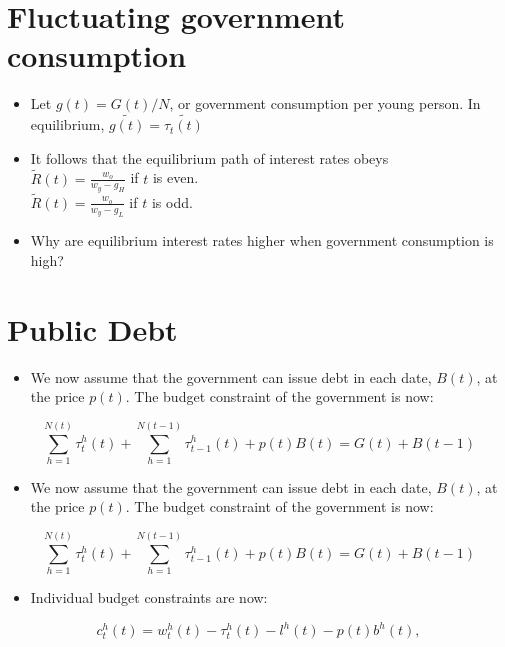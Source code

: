 \documentclass[10pt]{article}
\begin{document}
\section*{Fluctuating government consumption}
\begin{itemize}
  \item Let $g(t)=G(t) / N$, or government consumption per young person. In equilibrium, $\widetilde{g(t)}=\widetilde{\tau_{t}(t)}$
  \item It follows that the equilibrium path of interest rates obeys\\
$\widetilde{R}(t)=\frac{w_{o}}{w_{y}-g_{H}}$ if $t$ is even.\\
$\widetilde{R}(t)=\frac{w_{o}}{w_{y}-g_{L}}$ if $t$ is odd.
  \item Why are equilibrium interest rates higher when government consumption is high?
\end{itemize}

\section*{Public Debt}
\begin{itemize}
  \item We now assume that the government can issue debt in each date, $B(t)$, at the price $p(t)$. The budget constraint of the government is now:
\end{itemize}

$$
\sum_{h=1}^{N(t)} \tau_{t}^{h}(t)+\sum_{h=1}^{N(t-1)} \tau_{t-1}^{h}(t)+p(t) B(t)=G(t)+B(t-1)
$$

\begin{itemize}
  \item We now assume that the government can issue debt in each date, $B(t)$, at the price $p(t)$. The budget constraint of the government is now:
\end{itemize}

$$
\sum_{h=1}^{N(t)} \tau_{t}^{h}(t)+\sum_{h=1}^{N(t-1)} \tau_{t-1}^{h}(t)+p(t) B(t)=G(t)+B(t-1)
$$

\begin{itemize}
  \item Individual budget constraints are now:
\end{itemize}


\begin{equation*}
c_{t}^{h}(t)=w_{t}^{h}(t)-\tau_{t}^{h}(t)-l^{h}(t)-p(t) b^{h}(t), \tag{1}
\end{equation*}
\end{document}
